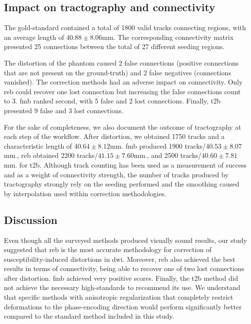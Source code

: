 \subsection{Impact on tractography and connectivity}

The gold-standard contained a total of 1800 valid tracks
connecting regions, with an average length of $40.88\pm8.06$mm.
The corresponding connectivity matrix presented 25 connections 
between the total of 27 different seeding regions.

The distortion of the phantom caused 2 false connections 
(positive connections that are not present on the ground-truth) 
and 2 false negatives (connections vanished).
The correction methods had an adverse impact
on connectivity. Only \gls*{reb} could recover one lost connection
but increasing the false connections count to 3.
\gls*{fmb} ranked second, with 5 false and 2 lost connections.
Finally, \gls*{t2b} presented 9 false and 3 lost connections.

For the sake of completeness, we also document the outcome
of tractography at each step of the workflow. After distortion,
we obtained 1750 tracks and a characteristic length of 
$40.64\pm8.12$mm.
\gls*{fmb} produced 1900 tracks/$40.53\pm8.07$mm., \gls*{reb}
obtained 2200 tracks/$41.15\pm7.60$mm., and 2500 
tracks/$40.60\pm7.81$mm. for \gls*{t2b}. Although track counting has
been used as a measurement of success and as a weight of connectivity 
strength, the number of tracks produced by tractography strongly rely
on the seeding performed and the smoothing caused by interpolation used
within correction methodologies.

\subsection{Discussion}

Even though all the surveyed methods produced visually 
sound results, our study suggested that \gls*{reb} is the 
most accurate methodology for correction of susceptibility-induced
distortions in \gls*{dwi}. Moreover, \gls*{reb} also achieved
the best results in terms of connectivity, being able to recover
one of two lost connections after distortion. \Gls*{fmb} achieved 
very positive scores. Finally, the \gls*{t2b} method did not achieve
the necessary high-standards to recommend its use. We understand
that specific methods with anisotropic regularization that completely
restrict deformations to the phase-encoding direction would perform
significantly better compared to the standard method included
in this study.

